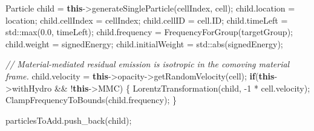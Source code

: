 \documentclass[
]{article}
\newenvironment{Shaded}{}{}
\newcommand{\BuiltInTok}[1]{\textcolor[rgb]{0.00,0.50,0.00}{#1}}
\newcommand{\CommentTok}[1]{\textcolor[rgb]{0.38,0.63,0.69}{\textit{#1}}}
\newcommand{\ControlFlowTok}[1]{\textcolor[rgb]{0.00,0.44,0.13}{\textbf{#1}}}
\newcommand{\DecValTok}[1]{\textcolor[rgb]{0.25,0.63,0.44}{#1}}
\newcommand{\FloatTok}[1]{\textcolor[rgb]{0.25,0.63,0.44}{#1}}
\newcommand{\KeywordTok}[1]{\textcolor[rgb]{0.00,0.44,0.13}{\textbf{#1}}}
\newcommand{\NormalTok}[1]{#1}
\newcommand{\OperatorTok}[1]{\textcolor[rgb]{0.40,0.40,0.40}{#1}}
\begin{document}
\begin{Shaded}
\begin{Highlighting}[]
\NormalTok{    Particle child }\OperatorTok{=} \KeywordTok{this}\OperatorTok{{-}\textgreater{}}\NormalTok{generateSingleParticle}\OperatorTok{(}\NormalTok{cellIndex}\OperatorTok{,}\NormalTok{ cell}\OperatorTok{);}
\NormalTok{    child}\OperatorTok{.}\NormalTok{location }\OperatorTok{=}\NormalTok{ location}\OperatorTok{;}
\NormalTok{    child}\OperatorTok{.}\NormalTok{cellIndex }\OperatorTok{=}\NormalTok{ cellIndex}\OperatorTok{;}
\NormalTok{    child}\OperatorTok{.}\NormalTok{cellID }\OperatorTok{=}\NormalTok{ cell}\OperatorTok{.}\NormalTok{ID}\OperatorTok{;}
\NormalTok{    child}\OperatorTok{.}\NormalTok{timeLeft }\OperatorTok{=} \BuiltInTok{std::}\NormalTok{max}\OperatorTok{(}\FloatTok{0.0}\OperatorTok{,}\NormalTok{ timeLeft}\OperatorTok{);}
\NormalTok{    child}\OperatorTok{.}\NormalTok{frequency }\OperatorTok{=}\NormalTok{ FrequencyForGroup}\OperatorTok{(}\NormalTok{targetGroup}\OperatorTok{);}
\NormalTok{    child}\OperatorTok{.}\NormalTok{weight }\OperatorTok{=}\NormalTok{ signedEnergy}\OperatorTok{;}
\NormalTok{    child}\OperatorTok{.}\NormalTok{initialWeight }\OperatorTok{=} \BuiltInTok{std::}\NormalTok{abs}\OperatorTok{(}\NormalTok{signedEnergy}\OperatorTok{);}

    \CommentTok{// Material{-}mediated residual emission is isotropic in the comoving material frame.}
\NormalTok{    child}\OperatorTok{.}\NormalTok{velocity }\OperatorTok{=} \KeywordTok{this}\OperatorTok{{-}\textgreater{}}\NormalTok{opacity}\OperatorTok{{-}\textgreater{}}\NormalTok{getRandomVelocity}\OperatorTok{(}\NormalTok{cell}\OperatorTok{);}
    \ControlFlowTok{if}\OperatorTok{(}\KeywordTok{this}\OperatorTok{{-}\textgreater{}}\NormalTok{withHydro }\OperatorTok{\&\&} \OperatorTok{!}\KeywordTok{this}\OperatorTok{{-}\textgreater{}}\NormalTok{MMC}\OperatorTok{)}
    \OperatorTok{\{}
\NormalTok{        LorentzTransformation}\OperatorTok{(}\NormalTok{child}\OperatorTok{,} \OperatorTok{{-}}\DecValTok{1} \OperatorTok{*}\NormalTok{ cell}\OperatorTok{.}\NormalTok{velocity}\OperatorTok{);}
\NormalTok{        ClampFrequencyToBounds}\OperatorTok{(}\NormalTok{child}\OperatorTok{.}\NormalTok{frequency}\OperatorTok{);}
    \OperatorTok{\}}

\NormalTok{    particlesToAdd}\OperatorTok{.}\NormalTok{push\_back}\OperatorTok{(}\NormalTok{child}\OperatorTok{);}


\end{Highlighting}
\end{Shaded}
\end{document}
